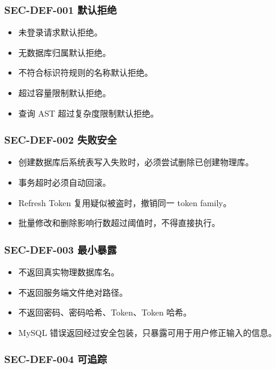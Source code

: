 \documentclass[
  a4paper,
  UTF8]{ctexart}
\providecommand{\tightlist}{%
  \setlength{\itemsep}{0pt}\setlength{\parskip}{0pt}}
\begin{document}
\hypertarget{sec-def-001-ux9ed8ux8ba4ux62d2ux7edd}{%
\subsubsection{SEC-DEF-001
默认拒绝}\label{sec-def-001-ux9ed8ux8ba4ux62d2ux7edd}}

\begin{itemize}
\tightlist
\item
  未登录请求默认拒绝。
\item
  无数据库归属默认拒绝。
\item
  不符合标识符规则的名称默认拒绝。
\item
  超过容量限制默认拒绝。
\item
  查询 AST 超过复杂度限制默认拒绝。
\end{itemize}

\hypertarget{sec-def-002-ux5931ux8d25ux5b89ux5168}{%
\subsubsection{SEC-DEF-002
失败安全}\label{sec-def-002-ux5931ux8d25ux5b89ux5168}}

\begin{itemize}
\tightlist
\item
  创建数据库后系统表写入失败时，必须尝试删除已创建物理库。
\item
  事务超时必须自动回滚。
\item
  Refresh Token 复用疑似被盗时，撤销同一 token family。
\item
  批量修改和删除影响行数超过阈值时，不得直接执行。
\end{itemize}

\hypertarget{sec-def-003-ux6700ux5c0fux66b4ux9732}{%
\subsubsection{SEC-DEF-003
最小暴露}\label{sec-def-003-ux6700ux5c0fux66b4ux9732}}

\begin{itemize}
\tightlist
\item
  不返回真实物理数据库名。
\item
  不返回服务端文件绝对路径。
\item
  不返回密码、密码哈希、Token、Token 哈希。
\item
  MySQL 错误返回经过安全包装，只暴露可用于用户修正输入的信息。
\end{itemize}

\hypertarget{sec-def-004-ux53efux8ffdux8e2a}{%
\subsubsection{SEC-DEF-004
可追踪}\label{sec-def-004-ux53efux8ffdux8e2a}}
\end{document}
